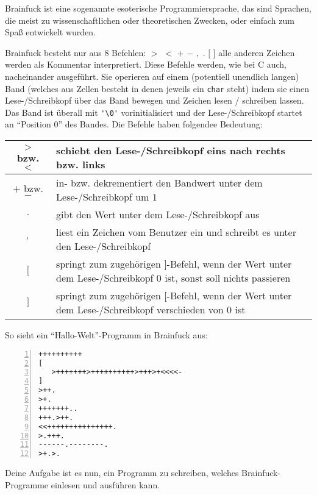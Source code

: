\documentclass{uebungszettel}
\begin{document}
\begin{aufg}
Brainfuck ist eine sogenannte esoterische Programmiersprache, das sind Sprachen, die meist zu wissenschaftlichen oder theoretischen Zwecken, oder einfach zum Spaß entwickelt wurden. 

Brainfuck besteht nur aus $8$ Befehlen: $>$ $<$ $+$ $-$ $,$ $.$ $[$ $]$ alle anderen Zeichen werden als Kommentar interpretiert. Diese Befehle werden, wie bei C auch, nacheinander ausgeführt. Sie operieren auf einem (potentiell unendlich langen) Band (welches aus Zellen besteht in denen jeweils ein \verb|char| steht) indem sie einen Lese-/Schreibkopf über das Band bewegen und Zeichen lesen / schreiben lassen. Das Band ist überall mit \verb|'\0'| vorinitialisiert und der Lese-/Schreibkopf startet an ``Position $0$'' des Bandes. Die Befehle haben folgendee Bedeutung:

\begin{tabular}{|c|p{10cm}|} \hline
$>$ bzw. $<$ & schiebt den Lese-/Schreibkopf eins nach rechts bzw. links \\\hline
$+$ bzw. $-$ & in- bzw. dekrementiert den Bandwert unter dem Lese-/Schreibkopf um $1$ \\\hline
$.$ & gibt den Wert unter dem Lese-/Schreibkopf aus \\\hline
$,$ & liest ein Zeichen vom Benutzer ein und schreibt es unter den Lese-/Schreibkopf \\\hline
$[$ & springt zum zugehörigen $]$-Befehl, wenn der Wert unter dem Lese-/Schreibkopf $0$ ist, sonst soll nichts passieren\\\hline
$]$ & springt zum zugehörigen $[$-Befehl, wenn der Wert unter dem Lese-/Schreibkopf verschieden von $0$ ist\\\hline
\end{tabular}

So sieht ein ``Hallo-Welt''-Programm in Brainfuck aus:

\begin{codelisting}
\begin{lstlisting}[numbers=left,numberstyle=\tiny,frame=tlrb,mathescape=true]
++++++++++
[
   >+++++++>++++++++++>+++>+<<<<-
]
>++.
>+.
+++++++..
+++.>++.
<<+++++++++++++++.
>.+++.
------.--------.
>+.>.
\end{lstlisting}
\end{codelisting}
Deine Aufgabe ist es nun, ein Programm zu schreiben, welches Brainfuck-Programme einlesen und ausführen kann. 
\end{aufg}
\end{document}

